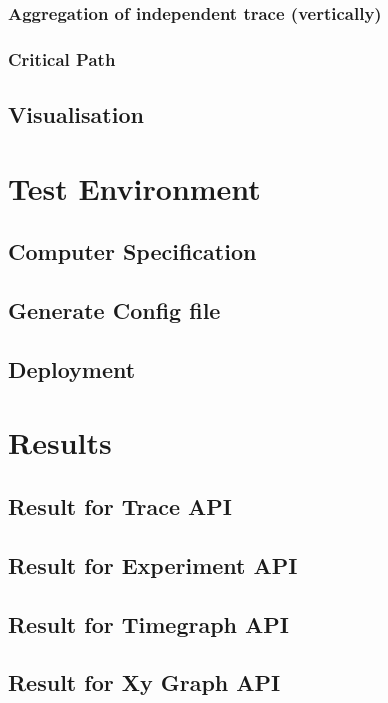 \subsubsection{Aggregation of independent trace (vertically)}

\subsubsection{Critical Path}

\subsection{Visualisation}

\section{Test Environment}

\subsection{Computer Specification}

\subsection{Generate Config file}

\subsection{Deployment}

\section{Results}

\subsection{Result for Trace API}

\subsection{Result for Experiment API}

\subsection{Result for Timegraph API}

\subsection{Result for Xy Graph API}

